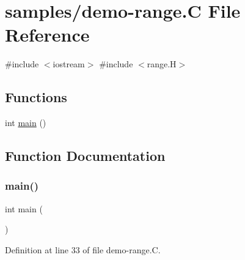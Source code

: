 \hypertarget{demo-range_8_c}{}\section{samples/demo-\/range.C File Reference}
\label{demo-range_8_c}
{\ttfamily \#include $<$iostream$>$}\newline
{\ttfamily \#include $<$range.\+H$>$}\newline
\subsection*{Functions}
\begin{DoxyCompactItemize}
\item 
int \hyperlink{demo-range_8_c_ae66f6b31b5ad750f1fe042a706a4e3d4}{main} ()
\end{DoxyCompactItemize}


\subsection{Function Documentation}
\mbox{\label{demo-range_8_c_ae66f6b31b5ad750f1fe042a706a4e3d4}} 
\subsubsection{\texorpdfstring{main()}{main()}}
{\footnotesize\ttfamily int main (\begin{DoxyParamCaption}{ }\end{DoxyParamCaption})}



Definition at line 33 of file demo-\/range.\+C.


